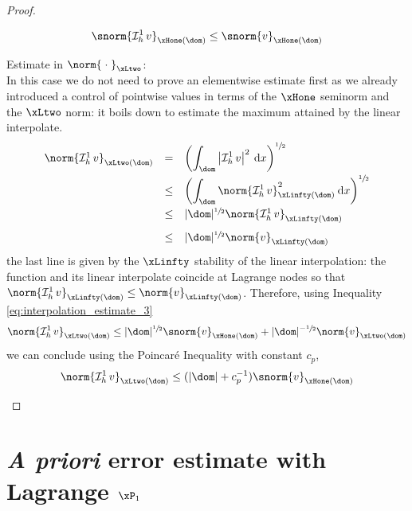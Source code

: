 \begin{proof}
\begin{tmaproofitems}
\begin{equation*}
\snorm{\Lgrh{1}v}_{\xHone(\dom)} \leq \snorm{v}_{\xHone(\dom)}
\end{equation*}
\item Estimate in $\norm{\;\cdot\;}_{\xLtwo}$:\\
In this case we do not need to prove an elementwise estimate first as we already introduced a control of pointwise values in terms of the $\xHone$ seminorm and the $\xLtwo$ norm: it boils down to estimate the maximum attained by the linear interpolate.
\begin{equation*}
\begin{array}{lcl}
\norm{\Lgrh{1}v}_{\xLtwo(\dom)} &=&\displaystyle \left(\int_\dom \Abs{\Lgrh{1}v}^2 \md x\right)^{\sfrac{1}{2}}\\[2ex]
                              &\leq&\displaystyle \left(\int_\dom \norm{\Lgrh{1}v}_{\xLinfty(\dom)}^2 \md x\right)^{\sfrac{1}{2}}\\[2ex]
                              &\leq& |\dom|^{\sfrac{1}{2}} \norm{\Lgrh{1}v}_{\xLinfty(\dom)}\\[2ex]
                              &\leq& |\dom|^{\sfrac{1}{2}} \norm{v}_{\xLinfty(\dom)}\\
\end{array}
\end{equation*}
the last line is given by the $\xLinfty$ stability of the linear interpolation: the function and its linear interpolate coincide at Lagrange nodes so that $\norm{\Lgrh{1}v}_{\xLinfty(\dom)} \leq \norm{v}_{\xLinfty(\dom)}$.
Therefore, using Inequality \eqref{eq:interpolation_estimate_3}
\begin{equation*}
\norm{\Lgrh{1}v}_{\xLtwo(\dom)}  \leq |\dom|^{\sfrac{1}{2}}\snorm{v}_{\xHone(\dom)} + |\dom|^{-\sfrac{1}{2}}\norm{v}_{\xLtwo(\dom)}
\end{equation*}
we can conclude using the Poincaré Inequality with constant $c_p$,
\begin{equation*}
\norm{\Lgrh{1}v}_{\xLtwo(\dom)}  \leq (|\dom| + c_p^{-1})\snorm{v}_{\xHone(\dom)}
\end{equation*}
\end{tmaproofitems}
\end{proof}

\section{\textit{A priori} error estimate with Lagrange $\xPone$}

